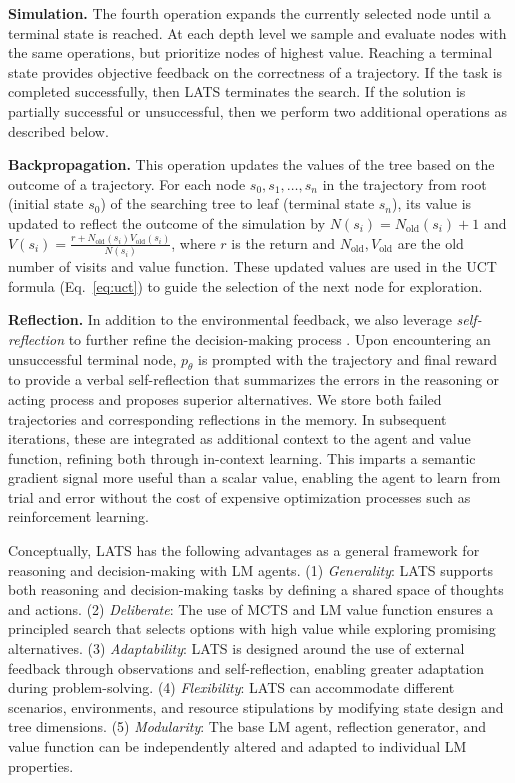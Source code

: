 \documentclass{article} \usepackage{iclr2024_conference,times}
\begin{document}
\textbf{Simulation.} The fourth operation expands the currently selected node until a terminal state is reached. At each depth level we sample and evaluate nodes with the same operations, but prioritize nodes of highest value. Reaching a terminal state provides objective feedback on the correctness of a trajectory. If the task is completed successfully, then LATS terminates the search. If the solution is partially successful or unsuccessful, then we perform two additional operations as described below.

\textbf{Backpropagation.} 
This operation updates the values of the tree based on the outcome of a trajectory. For each node $s_0,s_1,\dots, s_n$ in the trajectory from root (initial state $s_0$) of the searching tree to leaf (terminal state $s_n$), its value is updated to reflect the outcome of the simulation by $N(s_i)=N_{\text{old}}(s_i)+1$ and $V(s_i)=\frac{r+N_{\text{old}}(s_i)V_{\text{old}}(s_i)}{N(s_i)}$, where $r$ is the return and $N_{\text{old}}, V_{\text{old}}$ are the old number of visits and value function. These updated values are used in the UCT formula (Eq.~\ref{eq:uct}) to guide the selection of the next node for exploration.

\textbf{Reflection.}
In addition to the environmental feedback, we also leverage \textit{self-reflection} to further refine the decision-making process \citep{shinn2023reflexion, madaan2023selfrefine}. Upon encountering an unsuccessful terminal node, $p_\theta$ is prompted with the trajectory and final reward to provide a verbal self-reflection that summarizes the errors in the reasoning or acting process and proposes superior alternatives. We store both failed trajectories and corresponding reflections in the memory. In subsequent iterations, these are integrated as additional context to the agent and value function, refining both through in-context learning. This imparts a semantic gradient signal more useful than a scalar value, enabling the agent to learn from trial and error without the cost of expensive optimization processes such as reinforcement learning.

Conceptually, LATS has the following advantages as a general framework for reasoning and decision-making with LM agents.
(1) \textit{Generality}: LATS supports both reasoning and decision-making tasks by defining a shared space of thoughts and actions. (2) \textit{Deliberate}: The use of MCTS and LM value function ensures a principled search that selects options with high value while exploring promising alternatives. (3) \textit{Adaptability}: LATS is designed around the use of external feedback through observations and self-reflection, enabling greater adaptation during problem-solving. (4) \textit{Flexibility}: LATS can accommodate different scenarios, environments, and resource stipulations by modifying state design and tree dimensions. (5) \textit{Modularity}: The base LM agent, reflection generator, and value function can be independently altered and adapted to individual LM properties.
\end{document}
